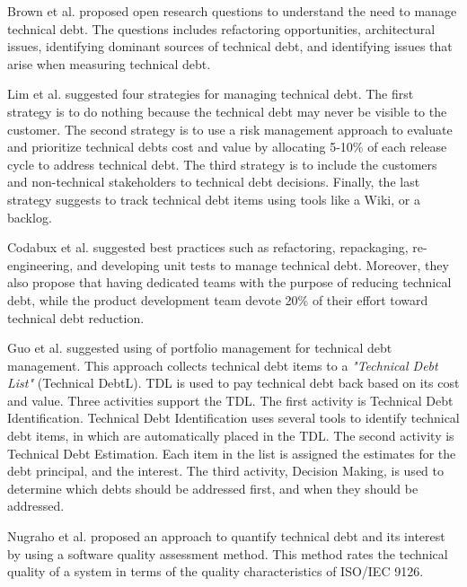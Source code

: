 {Brown et al.\cite{foser076-brown} proposed open research questions to understand the need to manage technical debt. The questions includes refactoring opportunities, architectural issues, identifying dominant sources of technical debt, and identifying issues that arise when measuring technical debt.

Lim et al.\cite{lim-taksande} suggested four strategies for managing technical debt. The first strategy is to do nothing because the technical debt may never be visible to the customer. The second strategy is to use a risk management approach to evaluate and prioritize technical debts cost and value by allocating 5-10\% of each release cycle to address technical debt. The third strategy is to include the customers and non-technical stakeholders to technical debt decisions. Finally, the last strategy suggests to track technical debt items using tools like a Wiki, or a backlog.

Codabux et al.\cite{p8-codabux} suggested best practices such as refactoring, repackaging, re-engineering, and developing unit tests to manage technical debt. Moreover, they also propose that having dedicated teams with the purpose of reducing technical debt, while the product development team devote 20\% of their effort toward technical debt reduction.
	
Guo et al.\cite{p31-guo} suggested using of portfolio management for technical debt management. This approach collects technical debt items to a \textit{"Technical Debt List"} (Technical DebtL). TDL is used to pay technical debt back based on its cost and value. Three activities support the TDL. The first activity is Technical Debt Identification. Technical Debt Identification uses several tools to identify technical debt items, in which are automatically placed in the TDL. The second activity is Technical Debt Estimation. Each item in the list is assigned the estimates for the debt principal, and the interest. The third activity, Decision Making, is used to determine which debts should be addressed first, and when they should be addressed.

Nugraho et al.\cite{p1-nugraho} proposed an approach to quantify technical debt and its interest by using a software quality assessment method. This method rates the technical quality of a system in terms of the quality characteristics of ISO/IEC 9126. 

}

